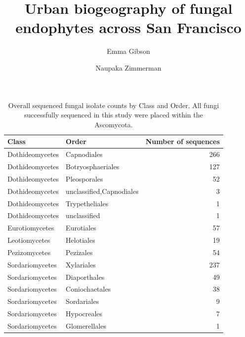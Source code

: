 \documentclass[fleqn,10pt,lineno]{wlpeerj} %
\title{Urban biogeography of fungal endophytes across San Francisco}
\author[1]{Emma Gibson}
\author[1]{Naupaka Zimmerman}
\affil[1]{Department of Biology, University of San Francisco}
\begin{document}
\flushbottom
\maketitle
\thispagestyle{empty}

\begin{table}[!h]

\caption{\label{tab:class-abundance-table}Overall sequenced fungal isolate counts by Class and Order. All fungi successfully  sequenced in this study were placed within the Ascomycota.}
\centering
\begin{tabular}[t]{llr}
\toprule
Class & Order & Number of sequences\\
\midrule
Dothideomycetes & Capnodiales & 266\\
Dothideomycetes & Botryosphaeriales & 127\\
Dothideomycetes & Pleosporales & 52\\
Dothideomycetes & unclassified,Capnodiales & 3\\
Dothideomycetes & Trypetheliales & 1\\
Dothideomycetes & unclassified & 1\\
\addlinespace
Eurotiomycetes & Eurotiales & 57\\
\addlinespace
Leotiomycetes & Helotiales & 19\\
\addlinespace
Pezizomycetes & Pezizales & 54\\
\addlinespace
Sordariomycetes & Xylariales & 237\\
Sordariomycetes & Diaporthales & 49\\
Sordariomycetes & Coniochaetales & 38\\
Sordariomycetes & Sordariales & 9\\
Sordariomycetes & Hypocreales & 7\\
Sordariomycetes & Glomerellales & 1\\
\bottomrule
\end{tabular}
\end{table}
\end{document}
